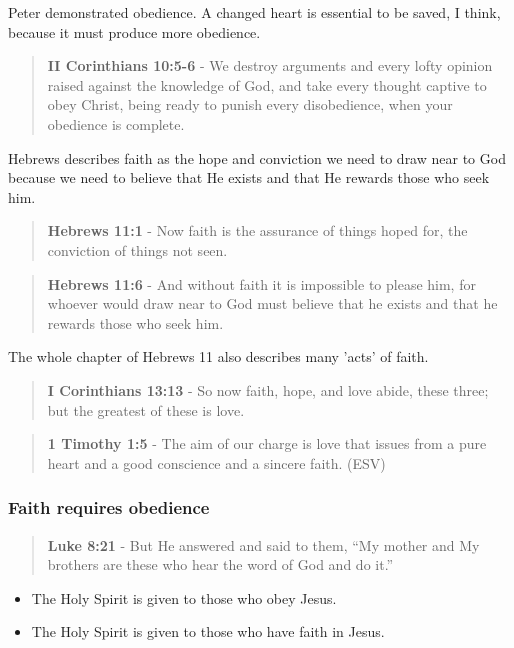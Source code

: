 \documentclass[11pt]{article}
\begin{document}
Peter demonstrated obedience. A changed heart is essential to be saved, I think, because it must produce more obedience.

\begin{quote}
\textbf{II Corinthians 10:5-6} - We destroy arguments and every lofty opinion raised against the knowledge of God, and take every thought captive to obey Christ, being ready to punish every disobedience, when your obedience is complete.
\end{quote}

Hebrews describes faith as the hope and conviction we need to draw near to God because we need to believe that He exists and that He rewards those who seek him.

\begin{quote}
\textbf{Hebrews 11:1} - Now faith is the assurance of things hoped for, the conviction of things not seen.
\end{quote}

\begin{quote}
\textbf{Hebrews 11:6} - And without faith it is impossible to please him, for whoever would draw near to God must believe that he exists and that he rewards those who seek him.
\end{quote}

The whole chapter of Hebrews 11 also describes many 'acts' of faith.

\begin{quote}
\textbf{I Corinthians 13:13} - So now faith, hope, and love abide, these three; but the greatest of these is love.
\end{quote}

\begin{quote}
\textbf{1 Timothy 1:5} -  The aim of our charge is love that issues from a pure heart and a good conscience and a sincere faith.  (ESV)
\end{quote}

\subsubsection{Faith requires obedience}
\label{sec:orgde6c68b}
\begin{quote}
\textbf{Luke 8:21} - But He answered and said to them, “My mother and My brothers are these who hear the word of God and do it.”
\end{quote}

\begin{itemize}
\item The Holy Spirit is given to those who obey Jesus.
\item The Holy Spirit is given to those who have faith in Jesus.
\end{itemize}
\end{document}

